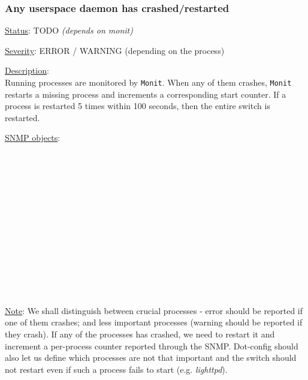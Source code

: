 \subsubsection{\bf Any userspace daemon has crashed/restarted}
		\label{fail:other:daemon_crash}
		\begin{pck_descr}
			\item [] \underline{Status}: TODO \emph{(depends on monit)}
			\item [] \underline{Severity}: ERROR / WARNING (depending on the process)
			\item [] \underline{Description}:\\
				Running processes are monitored by \texttt{Monit}. When any of them
				crashes, \texttt{Monit} restarts a missing process and increments a
				corresponding start counter. If a process is restarted 5 times within
				100 seconds, then the entire switch is restarted.
			\item [] \underline{SNMP objects}:\\
        {\footnotesize
				 \\
				\\
				\\
				\\
				\\
				\\
				\\
				\\
				\\
				\\
				\\
				 \\
				\\
         }
			\item [] \underline{Note}: We shall distinguish between crucial
				processes - error should be reported if one of them crashes; and less
				important processes (warning should be reported if they crash). If any
				of the processes has crashed, we need to restart it and increment a
				per-process counter reported through the SNMP. Dot-config should also
        let us define which processes are not that important and the switch
        should not restart even if such a process fails to start (e.g.
        \emph{lighttpd}).


\end{pck_descr}
